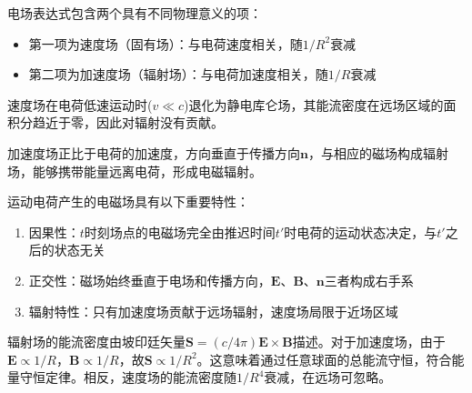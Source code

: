 
\begin{derivationnote}[电磁场的物理组成]
电场表达式包含两个具有不同物理意义的项：
\begin{itemize}
\item 第一项为速度场（固有场）：与电荷速度相关，随$1/R^2$衰减
\item 第二项为加速度场（辐射场）：与电荷加速度相关，随$1/R$衰减
\end{itemize}
\end{derivationnote}

\noindent 速度场在电荷低速运动时($v \ll c$)退化为静电库仑场，其能流密度在远场区域的面积分趋近于零，因此对辐射没有贡献。

加速度场正比于电荷的加速度，方向垂直于传播方向$\mathbf{n}$，与相应的磁场构成辐射场，能够携带能量远离电荷，形成电磁辐射。
\begin{theorem}[电磁场的基本性质]
运动电荷产生的电磁场具有以下重要特性：
\begin{enumerate}
\item 因果性：$t$时刻场点的电磁场完全由推迟时间$t'$时电荷的运动状态决定，与$t'$之后的状态无关
\item 正交性：磁场始终垂直于电场和传播方向，$\mathbf{E}$、$\mathbf{B}$、$\mathbf{n}$三者构成右手系
\item 辐射特性：只有加速度场贡献于远场辐射，速度场局限于近场区域
\end{enumerate}
\end{theorem}


\begin{derivationnote}[辐射场的能流特性]
辐射场的能流密度由坡印廷矢量$\mathbf{S} = (c/4\pi)\mathbf{E} \times \mathbf{B}$描述。对于加速度场，由于$\mathbf{E} \propto 1/R$，$\mathbf{B} \propto 1/R$，故$\mathbf{S} \propto 1/R^2$。这意味着通过任意球面的总能流守恒，符合能量守恒定律。相反，速度场的能流密度随$1/R^4$衰减，在远场可忽略。
\end{derivationnote}

